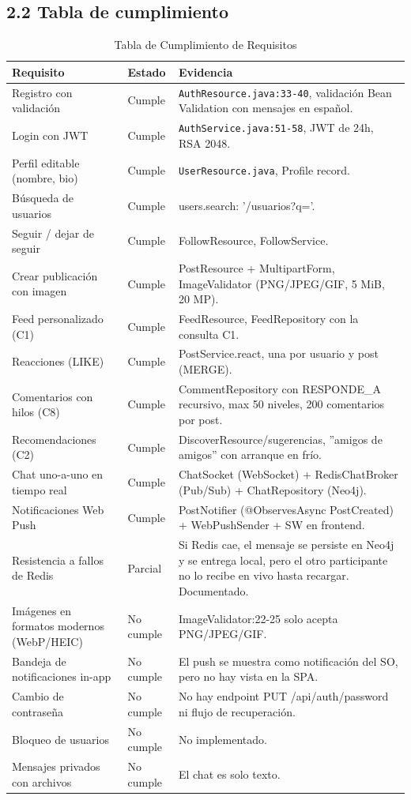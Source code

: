 \documentclass[10pt,a4paper]{article}
\newcommand{\code}[1]{\nolinkurl{#1}}
\begin{document}
\subsection{2.2 Tabla de cumplimiento}
\begin{table}[htbp]
\centering\small
\begin{tabularx}{\textwidth}{p{4.8cm} p{2.2cm} X}
\rowcolor{tableheader}\toprule
Requisito & Estado & Evidencia \\ \midrule
Registro con validación & Cumple & \code{AuthResource.java:33-40}, validación Bean Validation con mensajes en español. \\ \midrule
Login con JWT & Cumple & \code{AuthService.java:51-58}, JWT de 24h, RSA 2048. \\ \midrule
Perfil editable (nombre, bio) & Cumple & \code{UserResource.java}, Profile record. \\ \midrule
Búsqueda de usuarios & Cumple & users.search: '/usuarios?q='. \\ \midrule
Seguir / dejar de seguir & Cumple & FollowResource, FollowService. \\ \midrule
Crear publicación con imagen & Cumple & PostResource + MultipartForm, ImageValidator (PNG/JPEG/GIF, 5 MiB, 20 MP). \\ \midrule
Feed personalizado (C1) & Cumple & FeedResource, FeedRepository con la consulta C1. \\ \midrule
Reacciones (LIKE) & Cumple & PostService.react, una por usuario y post (MERGE). \\ \midrule
Comentarios con hilos (C8) & Cumple & CommentRepository con RESPONDE\_A recursivo, max 50 niveles, 200 comentarios por post. \\ \midrule
Recomendaciones (C2) & Cumple & DiscoverResource/sugerencias, ''amigos de amigos'' con arranque en frío. \\ \midrule
Chat uno-a-uno en tiempo real & Cumple & ChatSocket (WebSocket) + RedisChatBroker (Pub/Sub) + ChatRepository (Neo4j). \\ \midrule
Notificaciones Web Push & Cumple & PostNotifier (@ObservesAsync PostCreated) + WebPushSender + SW en frontend. \\ \midrule
Resistencia a fallos de Redis & Parcial & Si Redis cae, el mensaje se persiste en Neo4j y se entrega local, pero el otro participante no lo recibe en vivo hasta recargar. Documentado. \\ \midrule
Imágenes en formatos modernos (WebP/HEIC) & No cumple & ImageValidator:22-25 solo acepta PNG/JPEG/GIF. \\ \midrule
Bandeja de notificaciones in-app & No cumple & El push se muestra como notificación del SO, pero no hay vista en la SPA. \\ \midrule
Cambio de contraseña & No cumple & No hay endpoint PUT /api/auth/password ni flujo de recuperación. \\ \midrule
Bloqueo de usuarios & No cumple & No implementado. \\ \midrule
Mensajes privados con archivos & No cumple & El chat es solo texto. \\ \midrule
\bottomrule
\end{tabularx}
\caption{Tabla de Cumplimiento de Requisitos}
\end{table}
\end{document}

